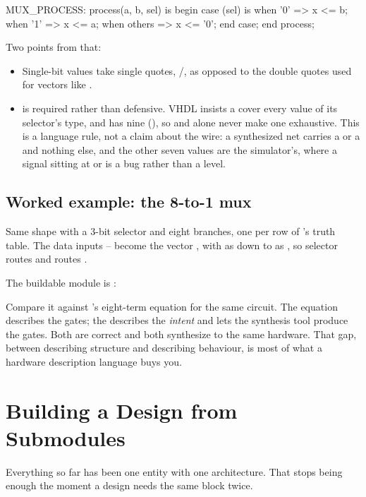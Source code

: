 \begin{vhdlcode}
MUX_PROCESS: process(a, b, sel) is
begin
    case (sel) is
        when '0'    => x <= b;
        when '1'    => x <= a;
        when others => x <= '0';
    end case;
end process;
\end{vhdlcode}

\noindent Two points from that:
\begin{itemize}
  \item Single-bit values take single quotes, /, as opposed to the double quotes
    used for vectors like .
  \item {} is required rather than defensive. VHDL insists a  cover every
    value of its selector's type, and  has nine (), so  and
     alone never make one exhaustive. This is a language rule, not a claim about the wire:
    a synthesized net carries a  or a  and nothing else, and the other seven values
    are the simulator's, where a signal sitting at  or  is a bug rather than a
    level.
\end{itemize}

\subsection{Worked example: the 8-to-1 mux}
\label{c2:mux8}
Same shape with a 3-bit selector and eight branches, one per row of 's truth table.
The data inputs -- become the vector , with  as
 down to  as , so selector  routes
 and  routes .

The buildable module is :


Compare it against 's eight-term equation for the same circuit. The equation describes
the gates; the  describes the \emph{intent} and lets the synthesis tool produce the gates.
Both are correct and both synthesize to the same hardware. That gap, between describing structure
and describing behaviour, is most of what a hardware description language buys you.

\section{Building a Design from Submodules}
\label{c2:a6}
Everything so far has been one entity with one architecture. That stops being enough the moment a
design needs the same block twice.

